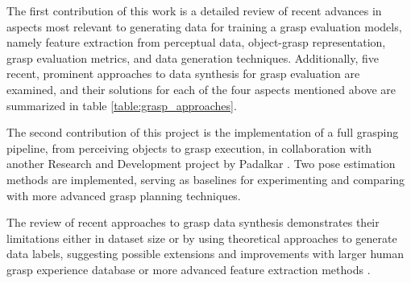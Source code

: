\documentclass[runningheads]{../llncs}
\begin{document}
The first contribution of this work is a detailed review of recent advances in aspects most relevant to generating data
for training a grasp evaluation models, namely feature extraction from perceptual data, object-grasp representation,
grasp evaluation metrics, and data generation techniques. Additionally, five recent, prominent approaches to data
synthesis for grasp evaluation are examined, and their solutions for each of the four aspects mentioned above are
summarized in table \ref{table:grasp_approaches}.

The second contribution of this project is the implementation of a full grasping pipeline, from perceiving objects to
grasp execution, in collaboration with another Research and Development project by Padalkar \cite{Padalkar2018}. Two
pose estimation methods are implemented, serving as baselines for experimenting and comparing with more advanced grasp
planning techniques.

The review of recent approaches to grasp data synthesis demonstrates their limitations either in dataset size or by
using theoretical approaches to generate data labels, suggesting possible extensions and improvements with larger human
grasp experience database \cite{Saudabayev2018} or more advanced feature extraction methods \cite{Varley2017}.

%


%
\end{document}
